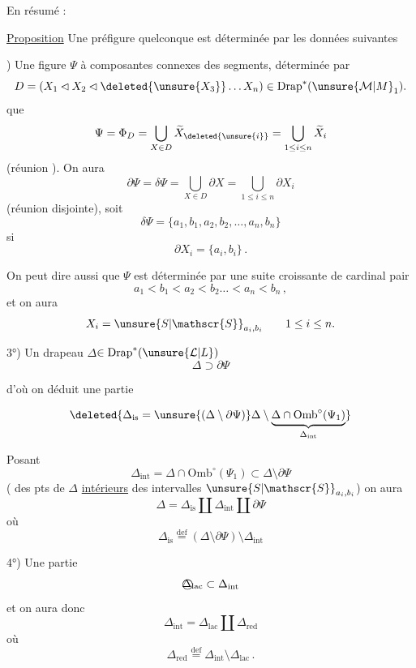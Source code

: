 En résumé :

\uline{Proposition} Une préfigure quelconque est déterminée par les données suivantes

) Une figure \textcircled{$\Psi$} à composantes connexes des  segments,  déterminée par
\[
D=(X_1\lhd X_2\lhd\deleted{\unsure{X_3}}\ldots X_n)\in\mathrm{Drap}^{*}(\unsure{\mathcal{M}|M}_1).
\]
 que
\[
\Psi=\Phi_D=\bigcup_{X\in D}\widetilde{X}_{\deleted{\unsure{i}}}=\bigcup_{1\leq i\leq n}\widetilde{X}_i
\]
(réunion ). On aura
\[
\partial\Psi=\delta\Psi=\bigcup_{X\in D}\partial X=\bigcup_{1\leq i\leq n}\partial X_i
\]
(réunion disjointe), soit
\[
\delta\Psi=\{a_1,b_1,a_2,b_2,\ldots,a_n,b_n\}
\]
si
\[
\partial X_i=\{a_i,b_i\}\,.
\]

On peut dire aussi que $\Psi$ est déterminée par une suite  croissante de cardinal pair
\[
a_1<b_1<a_2<b_2\ldots<a_n<b_n\,,
\]
et on aura
\[
X_i=\unsure{S|\mathscr{S}}_{a_i,b_i}\qquad 1\leq i\leq n.
\]

3°) Un drapeau \textcircled{$\Delta$}$\in\mathrm{Drap}^{*}(\unsure{\mathcal{L}|L})$
\[
\Delta\supset\partial\Psi
\]

d'où on déduit une partie

\[
\deleted{\Delta_{\mathrm{is}}=\unsure{(\Delta\setminus\partial\Psi)}\Delta\setminus\underbrace{\Delta\cap\mathrm{Omb}^{\circ}(\Psi_1)}_{\Delta_{\mathrm{int}}}}
\]

Posant
\[
\Delta_{\mathrm{int}}=\Delta\cap\mathrm{Omb}^{\circ}(\Psi_1)\subset\Delta\setminus\partial\Psi
\]
( des pts de $\Delta$ \uline{intérieurs}   des intervalles $\unsure{S|\mathscr{S}}_{a_i,b_i}$) on aura
\[
\Delta=\Delta_{\mathrm{is}}\amalg\Delta_{\mathrm{int}}\amalg\partial\Psi
\]
où
\[
\Delta_{\mathrm{is}}\overset{\mathrm{def}}{=}(\Delta\setminus\partial\Psi)\setminus\Delta_{\mathrm{int}}
\]

4°) Une partie
\[
\text{\textcircled{$\Delta_{\mathrm{lac}}$}}\subset\Delta_{\mathrm{int}}
\]
et on  aura donc
\[
\Delta_{\mathrm{int}}=\Delta_{\mathrm{lac}}\amalg\Delta_{\mathrm{red}}
\]
où
\[
\Delta_{\mathrm{red}}\overset{\mathrm{def}}{=}\Delta_{\mathrm{int}}\setminus\Delta_{\mathrm{lac}}\,.
\]

